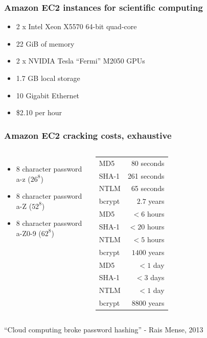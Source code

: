 \documentclass{beamer}
\begin{document}
\begin{frame}
    \frametitle{Amazon EC2 instances for scientific computing}
    \begin{itemize}
      \item 2 x Intel Xeon X5570 64-bit quad-core
      \item 22 GiB of memory
      \item 2 x NVIDIA Tesla ``Fermi'' M2050 GPUs
      \item 1.7 GB local storage
      \item 10 Gigabit Ethernet
      \item \$2.10 per hour
    \end{itemize}
\end{frame}

\begin{frame}[fragile]
    \frametitle{Amazon EC2 cracking costs, exhaustive}
    \begin{columns}
            \begin{itemize}
                \item 8 character password a-z ($26^8$)
                \item 8 character password a-Z ($52^8$)
                \item 8 character password a-Z0-9 ($62^8$)
            \end{itemize}
            \begin{tabular}{l | r}
            MD5 & 80 seconds \\
            SHA-1 & 261 seconds \\
            NTLM & 65 seconds \\
            bcrypt & $~2.7$ years \\ \hline
            MD5 & $<6$ hours \\
            SHA-1 & $<20$ hours \\
            NTLM & $<5$ hours \\
            bcrypt & $~1400$ years \\ \hline
            MD5 & $<1$ day \\
            SHA-1 & $<3$ days \\
            NTLM & $<1$ day \\
            bcrypt & $~8800$ years \\
            \end{tabular}
    \end{columns}
    \footnotesize{``Cloud computing broke password hashing'' - Rais Mense, 2013}

\end{frame}
\end{document}
